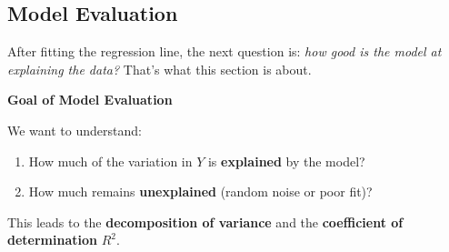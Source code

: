 \subsection{Model Evaluation}

After fitting the regression line, the next question is: \emph{how good is the model at explaining the data?} That's what this section is about.

\highspace
\begin{flushleft}
    \textcolor{Green3}{ \textbf{Goal of Model Evaluation}}
\end{flushleft}
We want to understand:
\begin{enumerate}
    \item How much of the variation in $Y$ is \textbf{explained} by the model?
    \item How much remains \textbf{unexplained} (random noise or poor fit)?
\end{enumerate}
This leads to the \textbf{decomposition of variance} and the \textbf{coefficient of determination} $R^{2}$.

